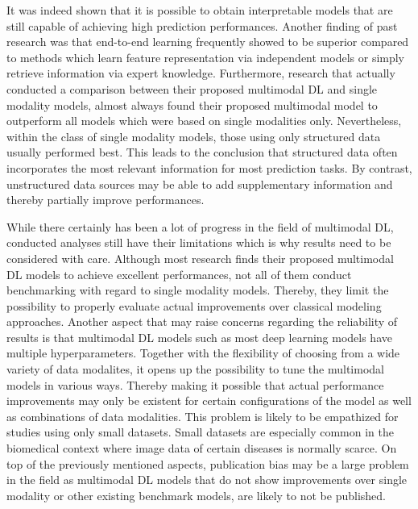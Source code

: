 \documentclass[
]{krantz}
\begin{document}
It was indeed shown that it is possible to obtain interpretable models that are still capable of achieving high prediction performances. Another finding of past research was that end-to-end learning frequently showed to be superior compared to methods which learn feature representation via independent models or simply retrieve information via expert knowledge. Furthermore, research that actually conducted a comparison between their proposed multimodal DL and single modality models, almost always found their proposed multimodal model to outperform all models which were based on single modalities only. Nevertheless, within the class of single modality models, those using only structured data usually performed best. This leads to the conclusion that structured data often incorporates the most relevant information for most prediction tasks. By contrast, unstructured data sources may be able to add supplementary information and thereby partially improve performances.

While there certainly has been a lot of progress in the field of multimodal DL, conducted analyses still have their limitations which is why results need to be considered with care. Although most research finds their proposed multimodal DL models to achieve excellent performances, not all of them conduct benchmarking with regard to single modality models. Thereby, they limit the possibility to properly evaluate actual improvements over classical modeling approaches. Another aspect that may raise concerns regarding the reliability of results is that multimodal DL models such as most deep learning models have multiple hyperparameters. Together with the flexibility of choosing from a wide variety of data modalites, it opens up the possibility to tune the multimodal models in various ways. Thereby making it possible that actual performance improvements may only be existent for certain configurations of the model as well as combinations of data modalities. This problem is likely to be empathized for studies using only small datasets. Small datasets are especially common in the biomedical context where image data of certain diseases is normally scarce. On top of the previously mentioned aspects, publication bias may be a large problem in the field as multimodal DL models that do not show improvements over single modality or other existing benchmark models, are likely to not be published.
\end{document}
